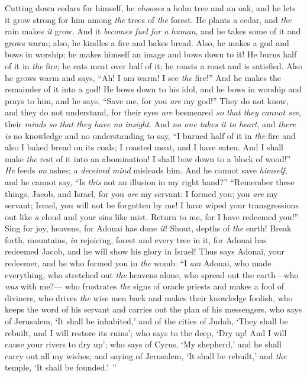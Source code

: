 \begin{biblechapter}
\verse Cutting down cedars for himself, 
he \textit{chooses} a holm tree and an oak, 
and he lets it grow strong for him among \textit{the} trees of \textit{the} forest. 
He plants a cedar, and \textit{the} rain makes \textit{it} grow.
\verse And it \textit{becomes fuel for a human}, 
and he takes some of it and grows warm; 
also, he kindles a fire and bakes bread. 
Also, he makes a god and bows in worship; 
he makes himself an image and bows down to it!
\verse He burns half of it in \textit{the} fire; 
he eats meat over half of it; 
he roasts a roast and is satisfied. 
Also he grows warm and says, “Ah! 
I am warm! I see \textit{the} fire!”
\verse And he makes the remainder of it into a god! 
He bows down to his idol, 
and he bows in worship and prays to him, 
and he says, “Save me, for you \textit{are} my god!”
\verse They do not know, 
and they do not understand, 
for their eyes \textit{are} besmeared \textit{so that they cannot see}, 
their \textit{minds} \textit{so that they have no insight}.
\verse And \textit{no one takes it to heart}, and \textit{there is} no knowledge 
and no understanding to say, “I burned half of it in \textit{the} fire 
and also I baked bread on its coals; 
I roasted meat, and I have eaten. 
And I shall make \textit{the} rest of it into an abomination! 
I shall bow down to a block of wood!”
\verse \textit{He} feeds \textit{on} ashes; a \textit{deceived mind} misleads him. 
And he cannot save \textit{himself}, and he cannot say, 
“Is \textit{this} not an illusion in my right hand?”
 “Remember these things, Jacob, 
and Israel, for you \textit{are} my servant: 
I formed you; you \textit{are} my servant; 
Israel, you will not be forgotten by me!
\verse I have wiped your transgressions out like \textit{a} cloud 
and your sins like mist. 
Return to me, 
for I have redeemed you!”
\verse Sing for joy, heavens, for Adonai has done \textit{it}! 
Shout, depths of \textit{the} earth! 
Break forth, mountains, \textit{in} rejoicing, 
forest and every tree in it, 
for Adonai has redeemed Jacob, 
and he will show his glory in Israel!
 Thus says Adonai, your redeemer, 
and he who formed you in \textit{the} womb: 
“I \textit{am} Adonai, who made everything, 
who stretched out \textit{the} heavens alone, 
who spread out the earth—who \textit{was} with me?—
\verse who frustrates \textit{the} signs of oracle priests 
and makes a fool of diviners, 
who drives \textit{the} wise men back 
and makes their knowledge foolish,
\verse who keeps the word of his servant 
and carries out the plan of his messengers, 
who says of Jerusalem, ‘It shall be inhabited,’ 
and of the cities of Judah, ‘They shall be rebuilt, 
and I will restore its ruins’;
\verse who says to the deep, ‘Dry up! 
And I will cause your rivers to dry up’;
\verse who says of Cyrus, ‘My shepherd,’ 
and he shall carry out all my wishes; 
and saying of Jerusalem, ‘It shall be rebuilt,’ 
and \textit{the} temple, ‘It shall be founded.’ ”
\end{biblechapter}

